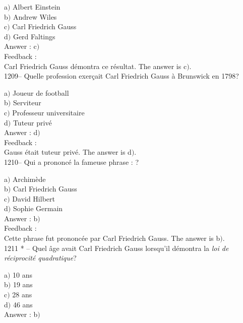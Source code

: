 \documentclass[letterpaper, 12pt]{article}
\begin{document}
a$)$ Albert Einstein\\
b$)$ Andrew Wiles \\
c$)$ Carl Friedrich Gauss \\
d$)$ Gerd Faltings \\

Answer : c$)$\\

Feedback : \\
Carl Friedrich Gauss d\'emontra ce r\'esultat.
The answer is c$)$.\\

1209-- Quelle profession exer\c cait Carl Friedrich Gauss \`a
Brunswick en 1798?

a$)$ Joueur de football\\
b$)$ Serviteur \\
c$)$ Professeur universitaire \\
d$)$ Tuteur priv\'e \\

Answer : d$)$\\

Feedback : \\
Gauss \'etait tuteur priv\'e.
The answer is d$)$.\\

1210-- Qui a prononc\'e la fameuse phrase : \fg ?

a$)$ Archim\`ede \\
b$)$ Carl Friedrich Gauss \\
c$)$ David Hilbert \\
d$)$ Sophie Germain\\

Answer : b$)$\\

Feedback : \\
Cette phrase fut prononc\'ee par Carl Friedrich Gauss.
The answer is b$)$.\\

1211 * -- Quel \^age avait Carl Friedrich Gauss lorsqu'il d\'emontra
la {\sl loi de r\'eciprocit\'e quadratique}?

a$)$ 10 ans \\
b$)$ 19 ans \\
c$)$ 28 ans \\
d$)$ 46 ans\\

Answer : b$)$\\
\end{document}
